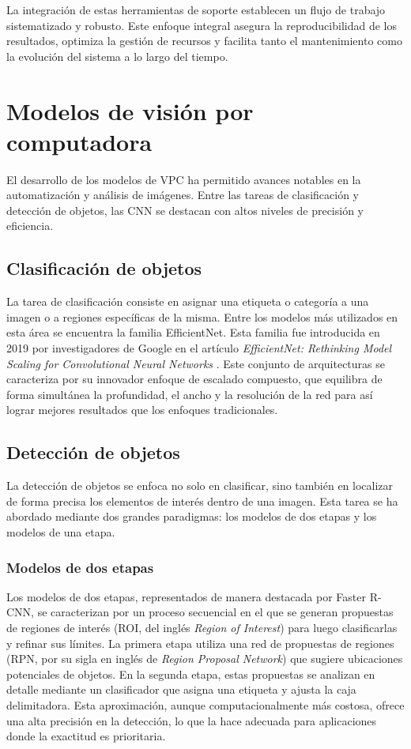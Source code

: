 La integración de estas herramientas de soporte establecen un flujo de trabajo sistematizado y robusto. Este enfoque integral asegura la reproducibilidad de los resultados, optimiza la gestión de recursos y facilita tanto el mantenimiento como la evolución del sistema a lo largo del tiempo.

\section{Modelos de visión por computadora} \label{sec:modelosVisPC}

El desarrollo de los modelos de VPC ha permitido avances notables en la automatización y análisis de imágenes. Entre las tareas de clasificación y detección de objetos, las CNN se destacan con altos niveles de precisión y eficiencia.

\subsection{Clasificación de objetos}

La tarea de clasificación consiste en asignar una etiqueta o categoría a una imagen o a regiones específicas de la misma. Entre los modelos más utilizados en esta área se encuentra la familia EfficientNet. Esta familia fue introducida en 2019 por investigadores de Google en el artículo \textit{EfficientNet: Rethinking Model Scaling for Convolutional Neural Networks} \citep{tan_efficientnet_2020}. Este conjunto de arquitecturas se caracteriza por su innovador enfoque de escalado compuesto, que equilibra de forma simultánea la profundidad, el ancho y la resolución de la red para así lograr mejores resultados que los enfoques tradicionales.

\subsection{Detección de objetos}

La detección de objetos se enfoca no solo en clasificar, sino también en localizar de forma precisa los elementos de interés dentro de una imagen. Esta tarea se ha abordado mediante dos grandes paradigmas: los modelos de dos etapas y los modelos de una etapa.

\subsubsection{Modelos de dos etapas}

Los modelos de dos etapas, representados de manera destacada por Faster R-CNN, se caracterizan por un proceso secuencial en el que se generan propuestas de regiones de interés (ROI, del inglés \textit{Region of Interest}) para luego clasificarlas y refinar sus límites. La primera etapa utiliza una red de propuestas de regiones (RPN, por su sigla en inglés de \textit{Region Proposal Network}) que sugiere ubicaciones potenciales de objetos. En la segunda etapa, estas propuestas se analizan en detalle mediante un clasificador que asigna una etiqueta y ajusta la caja delimitadora. Esta aproximación, aunque computacionalmente más costosa, ofrece una alta precisión en la detección, lo que la hace adecuada para aplicaciones donde la exactitud es prioritaria.

